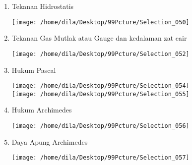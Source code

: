 \documentclass[12pt,a4paper,draft,final,oneside,twoside,openright,openany]{article}
\begin{document}
\begin{enumerate}
\begin{enumerate}
				\item Tekanan Hidrostatis
					\begin{center}
						\texttt{[image: /home/dila/Desktop/99Pcture/Selection\_050]}
					\end{center}
				\item Tekanan Gas Mutlak atau Gauge dan kedalaman zat cair
				\begin{center}
					\texttt{[image: /home/dila/Desktop/99Pcture/Selection\_052]}
				\end{center}
				\item Hukum Pascal 
				\begin{center}
					\texttt{[image: /home/dila/Desktop/99Pcture/Selection\_054]}\\
					\texttt{[image: /home/dila/Desktop/99Pcture/Selection\_055]}
				\end{center}
				\item Hukum Archimedes
				\begin{center}
					\texttt{[image: /home/dila/Desktop/99Pcture/Selection\_056]}
				\end{center}
				\item Daya Apung Archimedes
				\begin{center}
					\texttt{[image: /home/dila/Desktop/99Pcture/Selection\_057]}
				\end{center}
			\end{enumerate}
	\end{enumerate}
		\noindent\makebox[\linewidth]{\rule{\paperwidth}{0.4pt}}
		
\end{document}
